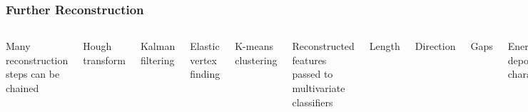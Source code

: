 \documentclass[10pt,professionalfonts,xcolor=table]{beamer}
\begin{document}
\begin{frame}
\begin{columns}[c]
\end{columns}

\end{frame}


\begin{frame}

\frametitle{Further Reconstruction}

\begin{columns}[c]
  \bangon
  \item Many reconstruction steps can be chained
    \bangon
    \item Hough transform
    \item Kalman filtering
    \item Elastic vertex finding
    \item K-means clustering
    \bangoff
  \gap
  \item Reconstructed features passed to multivariate classifiers
    \bangon
    \item Length
    \item Direction
    \item Gaps
    \item Energy deposition characteristics
    \bangoff
  \gap
  \item Low rate failures compound across multiple steps
  \gap
  \item Tuning for pathological failures can become tedious

  \bangoff
{}

\centering

\includegraphics[width=\textwidth]{figures/evd_steps/slice.png}

\includegraphics[width=\textwidth]{figures/evd_steps/hough.png}


\end{columns}
\end{frame}
\end{document}
